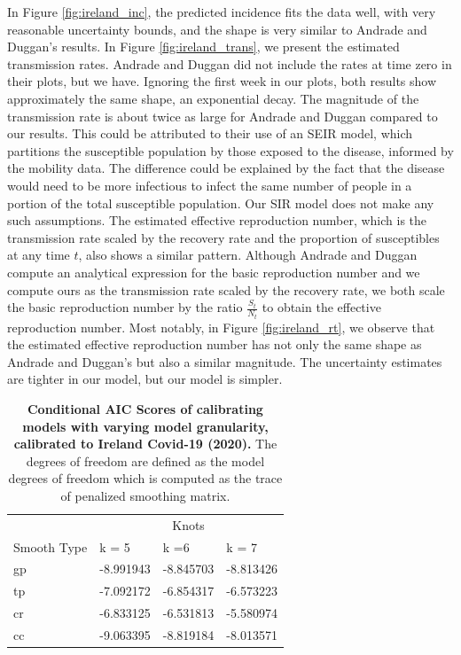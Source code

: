 \documentclass[
11pt, %
oneside, %
english, %
singlespacing, %
]{macthesis} %
\begin{document}
In Figure \ref{fig:ireland_inc}, the predicted incidence fits the data well, with very reasonable uncertainty bounds, and the shape is very similar to Andrade and Duggan's results. In Figure \ref{fig:ireland_trans}, we present the estimated transmission rates. Andrade and Duggan did not include the rates at time zero in their plots, but we have. Ignoring the first week in our plots, both results show approximately the same shape, an exponential decay. The magnitude of the transmission rate is about twice as large for Andrade and Duggan compared to our results. This could be attributed to their use of an SEIR model, which partitions the susceptible population by those exposed to the disease, informed by the mobility data. The difference could be explained by the fact that the disease would need to be more infectious to infect the same number of people in a portion of the total susceptible population. Our SIR model does not make any such assumptions. The estimated effective reproduction number, which is the transmission rate scaled by the recovery rate and the proportion of susceptibles at any time \(t\), also shows a similar pattern. Although Andrade and Duggan compute an analytical expression for the basic reproduction number and we compute ours as the transmission rate scaled by the recovery rate, we both scale the basic reproduction number by the ratio \(\frac{S_t}{N_t}\) to obtain the effective reproduction number. Most notably, in Figure \ref{fig:ireland_rt}, we observe that the estimated effective reproduction number has not only the same shape as Andrade and Duggan's but also a similar magnitude. The uncertainty estimates are tighter in our model, but our model is simpler.

\begin{table}[!h]
\centering
\caption{\label{tab:aic-table-ireland}\textbf{Conditional AIC Scores of calibrating models with varying model granularity, calibrated to Ireland Covid-19 (2020).} The degrees of freedom are defined as the model degrees of freedom which is computed as the trace of penalized smoothing matrix.}
\centering
\begin{tabular}[t]{llll}
\toprule
\multicolumn{1}{c}{ } & \multicolumn{3}{c}{Knots} \\
\cmidrule(l{3pt}r{3pt}){2-4}
Smooth Type & k = 5 & k =6 & k = 7\\
\midrule
gp & -8.991943 & -8.845703 & -8.813426\\
tp & -7.092172 & -6.854317 & -6.573223\\
cr & -6.833125 & -6.531813 & -5.580974\\
cc & -9.063395 & -8.819184 & -8.013571\\
\bottomrule
\end{tabular}
\end{table}
\end{document}
